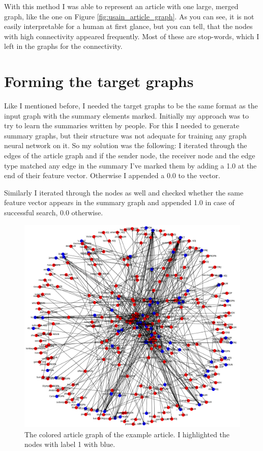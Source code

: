 With this method I was able to represent an article with one large, merged graph, like the one on Figure \ref{fig:usain_article_graph}. As you can see, it is not easily interpretable for a human at first glance, but you can tell, that the nodes with high connectivity appeared frequently. Most of these are stop-words, which I left in the graphs for the connectivity.

\FloatBarrier
\section{Forming the target graphs}
Like I mentioned before, I needed the target graphs to be the same format as the input graph with the summary elements marked. Initially my approach was to try to learn the summaries written by people. For this I needed to generate summary graphs, but their structure was not adequate for training any graph neural network on it. So my solution was the following: I iterated through the edges of the article graph and if the sender node, the receiver node and the edge type matched any edge in the summary I've marked them by adding a 1.0 at the end of their feature vector. Otherwise I appended a 0.0 to the vector.

Similarly I iterated through the nodes as well and checked whether the same feature vector appears in the summary graph and appended 1.0 in case of successful search, 0.0 otherwise.

\begin{figure}[!ht]
	\centering
	\includegraphics[width=150mm, keepaspectratio]{figures/usain_bolt_colored.png}
	\caption{The colored article graph of the example article. I highlighted the nodes with label 1 with blue.}
	\label{fig:usain_article_graph_colored}
\end{figure}

